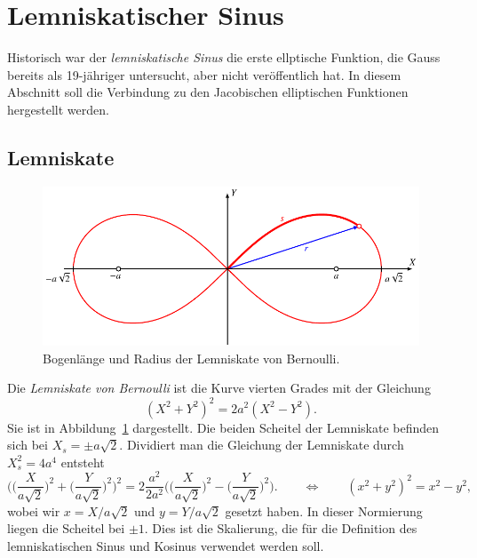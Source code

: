 %
%
%
\section{Lemniskatischer Sinus
\label{buch:elliptisch:section:lemniskate}}
Historisch war der {\em lemniskatische Sinus} die erste ellptische
Funktion, die Gauss bereits als 19-jähriger untersucht, aber nicht 
veröffentlich hat.
In diesem Abschnitt soll die Verbindung zu den Jacobischen
elliptischen Funktionen hergestellt werden.

%
%
\subsection{Lemniskate
\label{buch:gemotrie:subsection:lemniskate}}
\begin{figure}
\centering
\includegraphics{chapters/110-elliptisch/images/lemniskate.pdf}
\caption{Bogenlänge und Radius der Lemniskate von Bernoulli.
\label{buch:elliptisch:fig:lemniskate}}
\end{figure}
Die {\em Lemniskate von Bernoulli} ist die Kurve vierten Grades
mit der Gleichung
%
\begin{equation}
(X^2+Y^2)^2 = 2a^2(X^2-Y^2).
\label{buch:elliptisch:eqn:lemniskate}
\end{equation}
Sie ist in Abbildung~\ref{buch:elliptisch:fig:lemniskate}
dargestellt.
Die beiden Scheitel der Lemniskate befinden sich bei $X_s=\pm a\sqrt{2}$.
Dividiert man die Gleichung der Lemniskate durch $X_s^2=4a^4$ entsteht 
\begin{equation}
\biggl(
\biggl(\frac{X}{a\sqrt{2}}\biggr)^2
+
\biggl(\frac{Y}{a\sqrt{2}}\biggr)^2
\biggr)^2
=
2\frac{a^2}{2a^2}\biggl(
\biggl(\frac{X}{a\sqrt{2}}\biggr)^2
-
\biggl(\frac{Y}{a\sqrt{2}}\biggr)^2
\biggr).
\qquad
\Leftrightarrow
\qquad
(x^2+y^2)^2 = x^2-y^2,
\label{buch:elliptisch:eqn:lemniskatenormiert}
\end{equation}
wobei wir $x=X/a\sqrt{2}$ und $y=Y/a\sqrt{2}$ gesetzt haben.
In dieser Normierung liegen die Scheitel bei $\pm 1$.
Dies ist die Skalierung, die für die Definition des lemniskatischen
Sinus und Kosinus verwendet werden soll.

